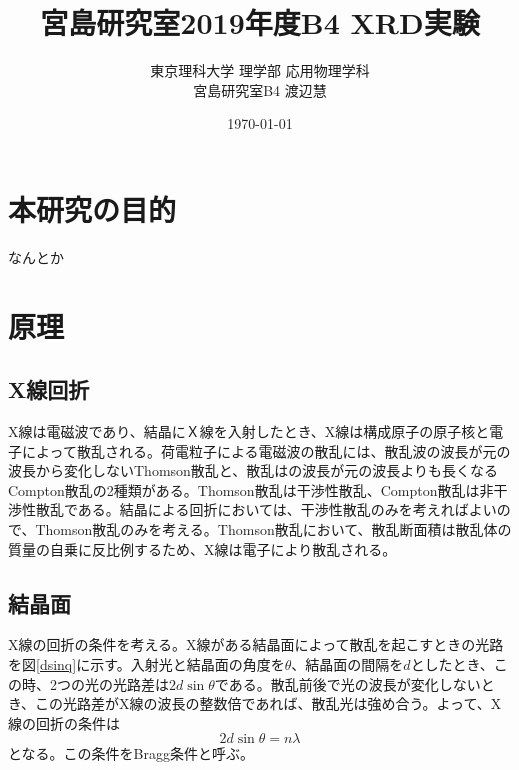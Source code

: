 \documentclass[11pt,a4j,uplatex]{jsarticle}
\title{宮島研究室2019年度B4 XRD実験}
\author{東京理科大学 理学部 応用物理学科\\宮島研究室B4 渡辺慧}
\date{\today}
\begin{document}
\maketitle %

\thispagestyle{empty}%
\clearpage
\addtocounter{page}{-1}%

\newpage

\tableofcontents %

\thispagestyle{empty}%
\clearpage
\addtocounter{page}{-1}


\newpage
\section{本研究の目的}
なんとか

\section{原理}
\subsection{X線回折}%
X線は電磁波であり、結晶にＸ線を入射したとき、X線は構成原子の原子核と電子によって散乱される。荷電粒子による電磁波の散乱には、散乱波の波長が元の波長から変化しないThomson散乱と、散乱はの波長が元の波長よりも長くなるCompton散乱の2種類がある。Thomson散乱は干渉性散乱、Compton散乱は非干渉性散乱である。結晶による回折においては、干渉性散乱のみを考えればよいので、Thomson散乱のみを考える。Thomson散乱において、散乱断面積は散乱体の質量の自乗に反比例するため、X線は電子により散乱される。

\subsection{結晶面}



X線の回折の条件を考える。X線がある結晶面によって散乱を起こすときの光路を図\ref{dsinq}に示す。入射光と結晶面の角度を$\theta$、結晶面の間隔を$d$としたとき、この時、2つの光の光路差は$2d\sin\theta$である。散乱前後で光の波長が変化しないとき、この光路差がX線の波長の整数倍であれば、散乱光は強め合う。よって、X線の回折の条件は
\begin{equation}
  2d\sin\theta=n\lambda
  \label{bragg}
\end{equation}
となる。この条件をBragg条件と呼ぶ。
\end{document}
